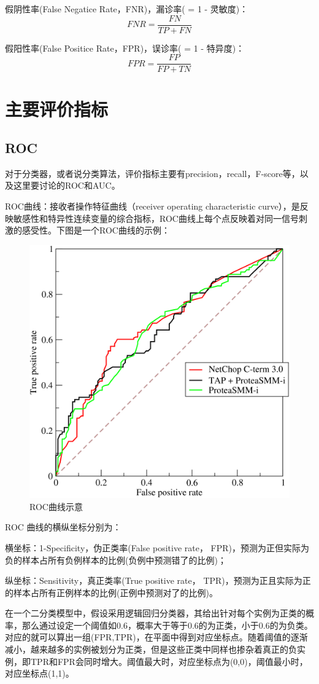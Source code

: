 \documentclass[12pt]{article}
\begin{document}
假阴性率(False Negatice Rate，FNR)，漏诊率( = 1 - 灵敏度)：
$$ FNR = \frac{FN}{TP+FN}$$

假阳性率(False Positice Rate，FPR)，误诊率( = 1 - 特异度)：
$$ FPR = \frac{FP}{FP+TN}$$

\section{主要评价指标 \cite{ROC-AUC}}
\subsection{ROC}
对于分类器，或者说分类算法，评价指标主要有precision，recall，F-score等，以及这里要讨论的ROC和AUC。

ROC曲线：接收者操作特征曲线（receiver operating characteristic curve），是反映敏感性和特异性连续变量的综合指标，ROC曲线上每个点反映着对同一信号刺激的感受性。下图是一个ROC曲线的示例：

\begin{figure}[ht]
  \centering
  \includegraphics[width=.5\textwidth]{fig/ROC_example.png} %
  \caption{ROC曲线示意} %
  \label{ROC_example} %
\end{figure}

ROC 曲线的横纵坐标分别为：

横坐标：1-Specificity，伪正类率(False positive rate， FPR)，预测为正但实际为负的样本占所有负例样本的比例(负例中预测错了的比例)；

纵坐标：Sensitivity，真正类率(True positive rate， TPR)，预测为正且实际为正的样本占所有正例样本的比例(正例中预测对了的比例)。

在一个二分类模型中，假设采用逻辑回归分类器，其给出针对每个实例为正类的概率，那么通过设定一个阈值如0.6，概率大于等于0.6的为正类，小于0.6的为负类。对应的就可以算出一组(FPR,TPR)，在平面中得到对应坐标点。随着阈值的逐渐减小，越来越多的实例被划分为正类，但是这些正类中同样也掺杂着真正的负实例，即TPR和FPR会同时增大。阈值最大时，对应坐标点为(0,0)，阈值最小时，对应坐标点(1,1)。
\end{document}
